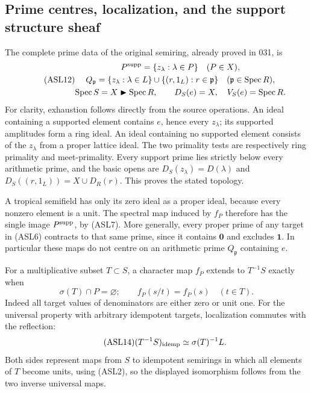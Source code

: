 \subsection{Prime centres, localization, and the support structure sheaf}

The complete prime data of the original semiring, already proved in
031, is
\begin{equation}\tag{ASL12}
 \begin{gathered}
 P^{\rm supp}=\{z_\lambda:\lambda\in P\}\quad(P\in X),\\
 Q_{\mathfrak p}=\{z_\lambda:\lambda\in L\}
              \cup\{(r,1_L):r\in\mathfrak p\}
                    \quad(\mathfrak p\in\operatorname{Spec}R),\\
 \operatorname{Spec}S=X\blacktriangleright\operatorname{Spec}R,
 \qquad D_S(e)=X,\quad V_S(e)=\operatorname{Spec}R.
 \end{gathered}
\end{equation}
For clarity, exhaustion follows directly from the source operations.
An ideal containing a supported element contains $e$, hence every
$z_\lambda$; its supported amplitudes form a ring ideal. An ideal
containing no supported element consists of the $z_\lambda$ from a
proper lattice ideal. The two primality tests are respectively ring
primality and meet-primality. Every support prime lies strictly below
every arithmetic prime, and the basic opens are
$D_S(z_\lambda)=D(\lambda)$ and
$D_S((r,1_L))=X\cup D_R(r)$. This proves the stated topology.

A tropical semifield has only its zero ideal as a proper ideal,
because every nonzero element is a unit. The spectral map induced by
$f_P$ therefore has the single image $P^{\rm supp}$, by (ASL7).
More generally, every proper prime of any target in (ASL6) contracts
to that same prime, since it contains $\mathbf0$ and excludes
$\mathbf1$. In particular these maps do not centre on an arithmetic
prime $Q_{\mathfrak p}$ containing $e$.

For a multiplicative subset $T\subset S$, a character map $f_P$
extends to $T^{-1}S$ exactly when
\begin{equation}\tag{ASL13}
 \sigma(T)\cap P=\varnothing;
 \qquad f_P(s/t)=f_P(s)\quad(t\in T).
\end{equation}
Indeed all target values of denominators are either zero or unit one.
For the universal property with arbitrary idempotent targets,
localization commutes with the reflection:
\begin{equation}\tag{ASL14}
 (T^{-1}S)_{\rm idemp}\simeq\sigma(T)^{-1}L.
\end{equation}
Both sides represent maps from $S$ to idempotent semirings in which
all elements of $T$ become units, using (ASL2), so the displayed
isomorphism follows from the two inverse universal maps.

